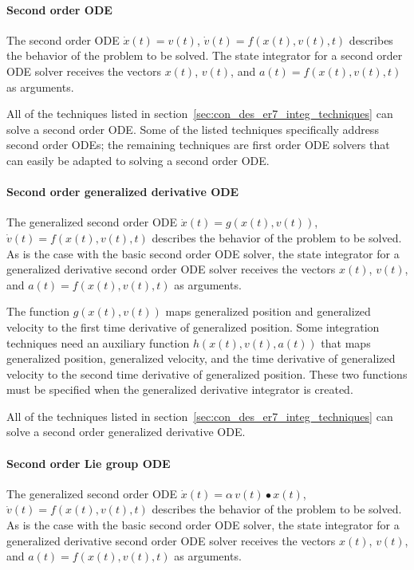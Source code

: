 \paragraph{Second order ODE}
The second order ODE
$\dot x(t) = v(t)$, $\dot v(t) = f(x(t),v(t),t)$
describes the behavior of the problem to be solved.
The state integrator for a second order ODE solver
receives the vectors $x(t)$, $v(t)$, and $a(t)=f(x(t),v(t),t)$ as arguments.

All of the techniques listed in section~\ref{sec:con_des_er7_integ_techniques}
can solve a second order ODE. Some of the listed techniques specifically address
second order ODEs; the remaining techniques are first order ODE solvers that can
easily be adapted to solving a second order ODE.

\paragraph {Second order generalized derivative ODE}
The generalized second order ODE
$\dot x(t) = g(x(t),v(t))$, $\dot v(t) = f(x(t),v(t),t)$
describes the behavior of the problem to be solved.
As is the case with the basic second order ODE solver, the state integrator
for a generalized derivative second order ODE solver
receives the vectors $x(t)$, $v(t)$, and $a(t)=f(x(t),v(t),t)$ as arguments.

The function $g(x(t),v(t))$ maps generalized position and generalized velocity
to the first time derivative of generalized position.
Some integration techniques need an auxiliary function $h(x(t),v(t),a(t))$
that maps generalized position, generalized velocity, and the time derivative
of generalized velocity to the second time derivative of generalized position.
These two functions must be specified when the generalized derivative integrator
is created.

All of the techniques listed in section~\ref{sec:con_des_er7_integ_techniques}
can solve a second order generalized derivative ODE.

\paragraph {Second order Lie group ODE}
The generalized second order ODE
$\dot x(t) = \alpha\, v(t) \bullet x(t)$, $\dot v(t) = f(x(t),v(t),t)$
describes the behavior of the problem to be solved.
As is the case with the basic second order ODE solver, the state integrator
for a generalized derivative second order ODE solver
receives the vectors $x(t)$, $v(t)$, and $a(t)=f(x(t),v(t),t)$ as arguments.

